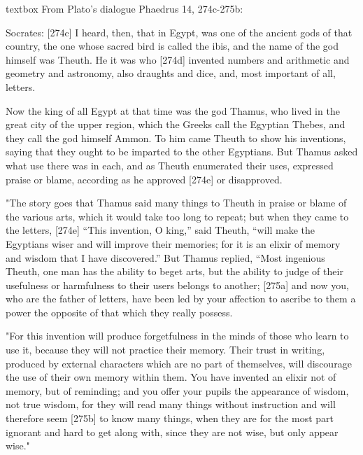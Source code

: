 \begin{table}[b]
\begin{scriptexample}[]{textbox}
From Plato's dialogue Phaedrus 14, 274c-275b:

Socrates: [274c] I heard, then, that   in Egypt, was one of the ancient gods of that country, the one whose sacred bird is called the ibis, and the name of the god himself was Theuth. He it was who [274d] invented numbers and arithmetic and geometry and astronomy, also draughts and dice, and, most important of all, letters. 

Now the king of all Egypt at that time was the god Thamus, who lived in the great city of the upper region, which the Greeks call the Egyptian Thebes, and they call the god himself Ammon. To him came Theuth to show his inventions, saying that they ought to be imparted to the other Egyptians. But Thamus asked what use there was in each, and as Theuth enumerated their uses, expressed praise or blame, according as he approved [274e] or disapproved.  

"The story goes that Thamus said many things to Theuth in praise or blame of the various arts, which it would take too long to repeat; but when they came to the letters, [274e] “This invention, O king,” said Theuth, “will make the Egyptians wiser and will improve their memories; for it is an elixir of memory and wisdom that I have discovered.” But Thamus replied, “Most ingenious Theuth, one man has the ability to beget arts, but the ability to judge of their usefulness or harmfulness to their users belongs to another; [275a] and now you, who are the father of letters, have been led by your affection to ascribe to them a power the opposite of that which they really possess.  

"For this invention will produce forgetfulness in the minds of those who learn to use it, because they will not practice their memory. Their trust in writing, produced by external characters which are no part of themselves, will discourage the use of their own memory within them. You have invented an elixir not of memory, but of reminding; and you offer your pupils the appearance of wisdom, not true wisdom, for they will read many things without instruction and will therefore seem [275b] to know many things, when they are for the most part ignorant and hard to get along with, since they are not wise, but only appear wise." 
\end{scriptexample}
\end{table}





